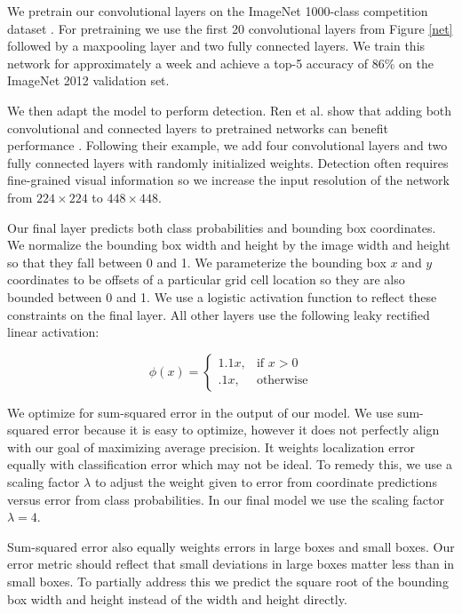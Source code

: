 \documentclass{article} %
\begin{document}
We pretrain our convolutional layers on the ImageNet 1000-class competition dataset \cite{ILSVRC15}. For pretraining we use the first 20 convolutional layers from Figure \ref{net} followed by a maxpooling layer and two fully connected layers. We train this network for approximately a week and achieve a top-5 accuracy of 86\% on the ImageNet 2012 validation set.

We then adapt the model to perform detection. Ren et al. show that adding both convolutional and connected layers to pretrained networks can benefit performance \cite{DBLP:journals/corr/RenHGZ015}. Following their example, we add four convolutional layers and two fully connected layers with randomly initialized weights. Detection often requires fine-grained visual information so we increase the input resolution of the network from $224 \times 224$ to $448 \times 448$.

Our final layer predicts both class probabilities and bounding box coordinates. We normalize the bounding box width and height by the image width and height so that they fall between 0 and 1. We parameterize the bounding box $x$ and $y$ coordinates to be offsets of a particular grid cell location so they are also bounded between 0 and 1. We use a logistic activation function to reflect these constraints on the final layer. All other layers use the following leaky rectified linear activation:

\begin{equation}
\phi(x) =
\begin{cases}
    1.1x, & \text{if } x > 0\\
    .1x, & \text{otherwise}
    \end{cases}
\end{equation}

We optimize for sum-squared error in the output of our model. We use sum-squared error because it is easy to optimize, however it does not perfectly align with our goal of maximizing average precision. It weights localization error equally with classification error which may not be ideal. To remedy this, we use a scaling factor $\lambda$ to adjust the weight given to error from coordinate predictions versus error from class probabilities. In our final model we use the scaling factor $\lambda = 4$.

Sum-squared error also equally weights errors in large boxes and small boxes. Our error metric should reflect that small deviations in large boxes matter less than in small boxes. To partially address this we predict the square root of the bounding box width and height instead of the width and height directly. 
\end{document}
